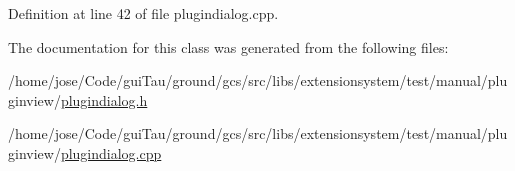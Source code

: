 Definition at line 42 of file plugindialog.\-cpp.



The documentation for this class was generated from the following files\-:\begin{DoxyCompactItemize}
\item 
/home/jose/\-Code/gui\-Tau/ground/gcs/src/libs/extensionsystem/test/manual/pluginview/\hyperlink{libs_2extensionsystem_2test_2manual_2pluginview_2plugindialog_8h}{plugindialog.\-h}\item 
/home/jose/\-Code/gui\-Tau/ground/gcs/src/libs/extensionsystem/test/manual/pluginview/\hyperlink{libs_2extensionsystem_2test_2manual_2pluginview_2plugindialog_8cpp}{plugindialog.\-cpp}\end{DoxyCompactItemize}
